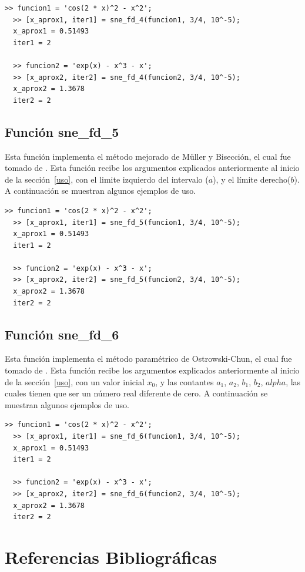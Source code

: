 \documentclass[12pt]{article}
\begin{document}
\begin{minipage}{\linewidth}
\begin{lstlisting}[frame = single]
  >> funcion1 = 'cos(2 * x)^2 - x^2';
  >> [x_aprox1, iter1] = sne_fd_4(funcion1, 3/4, 10^-5);
  x_aprox1 = 0.51493
  iter1 = 2

  >> funcion2 = 'exp(x) - x^3 - x';
  >> [x_aprox2, iter2] = sne_fd_4(funcion2, 3/4, 10^-5);
  x_aprox2 = 1.3678
  iter2 = 2
\end{lstlisting}
\end{minipage}

\subsection{Función sne\_fd\_5}
Esta función implementa el método mejorado de Müller y Bisección, el cual fue tomado de \cite{wu2005improved}. Esta función recibe los argumentos explicados anteriormente al inicio de la sección~\ref{uso}, con el limite izquierdo del intervalo ($a$), y el límite derecho($b$). A continuación se muestran algunos ejemplos de uso.

\begin{minipage}{\linewidth}
\begin{lstlisting}[frame = single]
  >> funcion1 = 'cos(2 * x)^2 - x^2';
  >> [x_aprox1, iter1] = sne_fd_5(funcion1, 3/4, 10^-5);
  x_aprox1 = 0.51493
  iter1 = 2

  >> funcion2 = 'exp(x) - x^3 - x';
  >> [x_aprox2, iter2] = sne_fd_5(funcion2, 3/4, 10^-5);
  x_aprox2 = 1.3678
  iter2 = 2
\end{lstlisting}
\end{minipage}

\subsection{Función sne\_fd\_6}
Esta función implementa el método paramétrico de Ostrowski-Chun, el cual fue tomado de \cite{cordero2015solving}. Esta función recibe los argumentos explicados anteriormente al inicio de la sección~\ref{uso}, con un valor inicial $x_{0}$, y las contantes $a_{1}$, $a_{2}$, $b_{1}$, $b_{2}$, $alpha$, las cuales tienen que ser un número real diferente de cero. A continuación se muestran algunos ejemplos de uso.

\begin{minipage}{\linewidth}
\begin{lstlisting}[frame = single]
  >> funcion1 = 'cos(2 * x)^2 - x^2';
  >> [x_aprox1, iter1] = sne_fd_6(funcion1, 3/4, 10^-5);
  x_aprox1 = 0.51493
  iter1 = 2

  >> funcion2 = 'exp(x) - x^3 - x';
  >> [x_aprox2, iter2] = sne_fd_6(funcion2, 3/4, 10^-5);
  x_aprox2 = 1.3678
  iter2 = 2
\end{lstlisting}
\end{minipage}

\newpage
\section{Referencias Bibliográficas}
\nocite{*}

\end{document}
